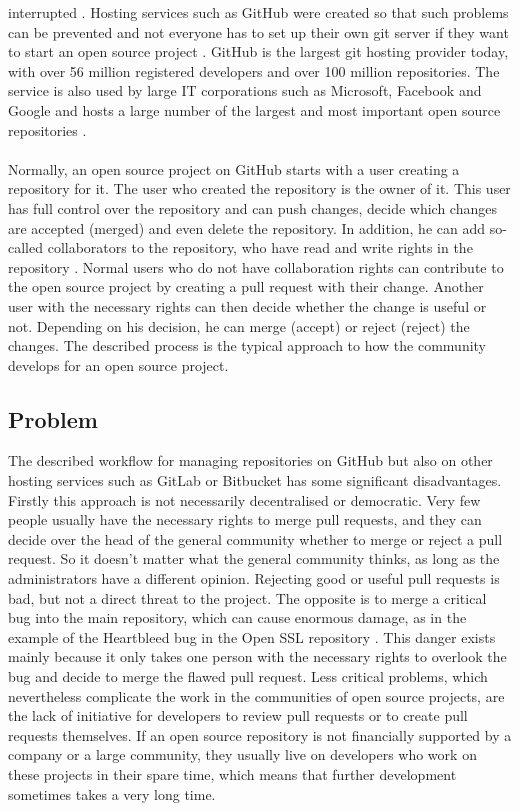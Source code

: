 \documentclass[sigconf]{acmart}
\begin{document}
interrupted \cite{ulrich2020dev}. Hosting services such as GitHub were created so that such problems can be prevented 
and not everyone has to set up their own git server if they want to start an open source project \cite{ulrich2020dev, git2021hub}.
GitHub is the largest git hosting provider today, with over 56 million registered developers and over 100 million repositories.
\cite{git2021hub} The service is also used by large IT corporations such as Microsoft, Facebook and Google and hosts a large 
number of the largest and most important open source repositories \cite{git2021stars}.\\ \\
Normally, an open source project on GitHub starts with a user creating a repository for it. The user who created the 
repository is the owner of it. This user has full control over the repository and can push changes, decide which changes are 
accepted (merged) and even delete the repository. In addition, he can add so-called collaborators to the repository, who have 
read and write rights in the repository \cite{git2021rights}. Normal users who do not have collaboration rights can contribute to 
the open source project by creating a pull request with their change. Another user with the necessary rights can then decide 
whether the change is useful or not. Depending on his decision, he can merge (accept) or reject (reject) the changes. 
The described process is the typical approach to how the community develops for an open source project.


\subsection{Problem}
The described workflow for managing repositories on GitHub but also on other hosting services such as GitLab or Bitbucket has 
some significant disadvantages. Firstly this approach is not necessarily decentralised or democratic. Very few people usually have 
the necessary rights to merge pull requests, and they can decide over the head of the general community whether to merge or reject
 a pull request. So it doesn't matter what the general community thinks, as long as the administrators have a different opinion. Rejecting
 good or useful pull requests is bad, but not a direct threat to the project. The opposite is to merge a critical bug into the main repository,
 which can cause enormous damage, as in the example of the Heartbleed bug in the Open SSL repository \cite{ioriheartbleed}. This 
danger exists mainly because it only takes one person with the necessary rights to overlook the bug and decide to merge the flawed 
pull request. Less critical problems, which nevertheless complicate the work in the communities of open source projects, are the lack
 of initiative for developers to review pull requests or to create pull requests themselves. If an open source repository is not financially
 supported by a company or a large community, they usually live on developers who work on these projects in their spare time, which 
means that further development sometimes takes a very long time. 
\end{document}
